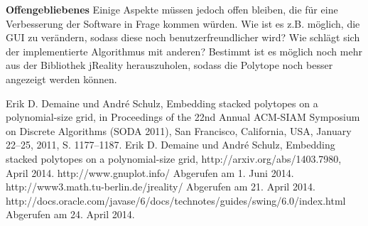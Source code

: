 \textbf{Offengebliebenes} Einige Aspekte müssen jedoch offen bleiben, die für eine Verbesserung der Software in Frage kommen würden. Wie ist es z.B. möglich, die GUI zu verändern, sodass diese noch benutzerfreundlicher wird? Wie schlägt sich der implementierte Algorithmus mit anderen? Bestimmt ist es möglich noch mehr aus der Bibliothek jReality herauszuholen, sodass die Polytope noch besser angezeigt werden können.



\begin{thebibliography}{999}
 Erik D. Demaine und André Schulz, Embedding stacked polytopes on a polynomial-size grid, in Proceedings of the 22nd Annual ACM-SIAM Symposium on Discrete Algorithms (SODA 2011), San Francisco, California, USA, January 22–25, 2011, S. 1177–1187.
 Erik D. Demaine und André Schulz, Embedding stacked polytopes on a polynomial-size grid, http://arxiv.org/abs/1403.7980, April 2014.
 http://www.gnuplot.info/ Abgerufen am 1. Juni 2014.
 http://www3.math.tu-berlin.de/jreality/ Abgerufen am 21. April 2014.
 http://docs.oracle.com/javase/6/docs/technotes/guides/swing/6.0/index.html Abgerufen am 24. April 2014.
\end{thebibliography}